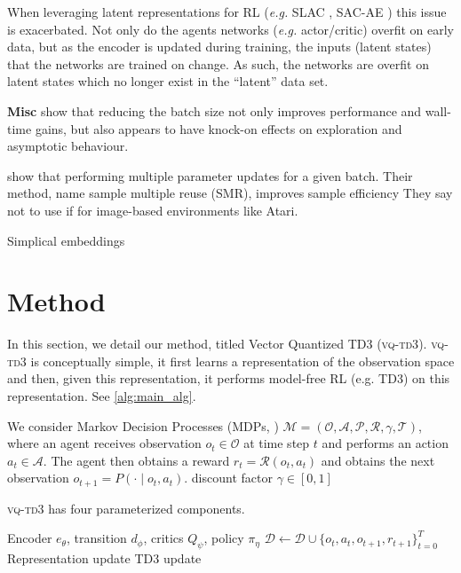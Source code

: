 \documentclass{article}
\makeatletter
\theoremstyle{plain}
\theoremstyle{definition}
\theoremstyle{remark}
\newcommand{\our}{\textsc{vq-td3}\xspace}
\newcommand{\eg}{\textit{e.g.\@}\xspace}
\makeatother
\begin{document}
When leveraging latent representations for RL (\eg SLAC \citep{leeStochasticLatentActorCritic2020},
SAC-AE \citep{yaratsImprovingSampleEfficiency2021}) this issue is exacerbated.
Not only do the agents networks (\eg actor/critic) overfit on early data, but as the encoder is updated during training, the
inputs (latent states) that the networks are trained on change.
As such, the networks are overfit on latent states which no longer exist in the ``latent'' data set.



\textbf{Misc}
\citet{obando-ceronSmallBatchDeep2023a} show that reducing the batch size not only improves
performance and wall-time gains, but also appears to have knock-on effects on exploration and asymptotic behaviour.

\citet{lyuOffPolicyRLAlgorithms2023} show that performing multiple parameter updates for a given batch.
Their method, name sample multiple reuse (SMR), improves sample efficiency
They say not to use if for image-based environments like Atari.


Simplical embeddings
\cite{lavoieSimplicialEmbeddingsSelfSupervised2022}


\section{Method}
\label{sec:method}

In this section, we detail our method, titled Vector Quantized TD3 (\our).
\our is conceptually simple, it first learns a representation of the observation space and then,
given this representation, it performs model-free RL (e.g. TD3) on this representation.
See \cref{alg:main_alg}.

We consider Markov Decision Processes (MDPs, \citet{bellmanMarkovianDecisionProcess1957a}) $\mathcal{M} = (\mathcal{O}, \mathcal{A}, \mathcal{P}, \mathcal{R}, \gamma,\mathcal{T})$, where an agent receives
observation $o_{t} \in \mathcal{O}$ at time step $t$ and performs an action $a_{t} \in \mathcal{A}$.
The agent then obtains a reward $r_{t} = \mathcal{R} (o_{t}, a_{t})$ and obtains the next observation
$o_{t+1} = P(\cdot \mid o_{t}, a_{t})$.
discount factor $\gamma \in [0, 1]$


\our has four parameterized components.
\begin{algorithm}[tb]
   \caption{\our}
   \label{alg:main_alg}
\begin{algorithmic}
    Encoder $e_{\theta}$, transition $d_{\phi}$, critics $Q_{\psi}$, policy $\pi_{\eta}$
    \STATE $\mathcal{D} \leftarrow \mathcal{D} \cup \{o_{t}, a_{t}, o_{t+1}, r_{t+1}\}^{T}_{t=0}$
        \STATE Representation update
        \STATE TD3 update
    \ENDFOR
   \ENDFOR
\end{algorithmic}
\end{algorithm}
\end{document}
